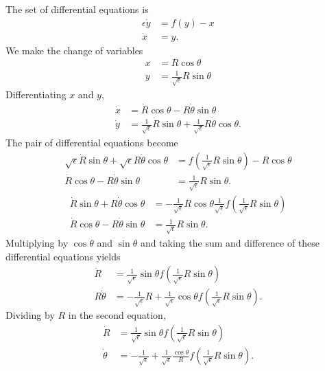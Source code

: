 \begin{Solution}
  The set of differential equations is
  \begin{align*}
    \epsilon \dot{y} &= f(y) - x \\
    \dot{x} &= y.
  \end{align*}
  We make the change of variables
  \begin{align*}
    x &= R \cos \theta \\
    y &= \frac{1}{\sqrt{\epsilon}} R \sin \theta
  \end{align*}
  Differentiating $x$ and $y$,
  \begin{align*}
    \dot{x} &= \dot{R} \cos \theta - R \dot{\theta} \sin \theta \\
    \dot{y} &= \frac{1}{\sqrt{\epsilon}} \dot{R} \sin \theta + 
    \frac{1}{\sqrt{\epsilon}} R \dot{\theta} \cos \theta.
  \end{align*}
  The pair of differential equations become
  \begin{align*}
    \sqrt{\epsilon} \dot{R} \sin \theta +
    \sqrt{\epsilon} R \dot{\theta} \cos \theta &= 
    f\left(\frac{1}{\sqrt{\epsilon}} R \sin\theta \right) -R \cos \theta \\
    \dot{R} \cos \theta - R \dot{\theta} \sin \theta &= \frac{1}{\sqrt{\epsilon}}
    R \sin \theta.
  \end{align*}
  \begin{align*}
    \dot{R} \sin \theta + R \dot{\theta} \cos \theta &= 
    - \frac{1}{\sqrt{\epsilon}} R \cos \theta 
    \frac{1}{\sqrt{\epsilon}}
    f\left(\frac{1}{\sqrt{\epsilon}} R \sin\theta \right)\\ 
    \dot{R} \cos \theta - R \dot{\theta} \sin \theta &= \frac{1}{\sqrt{\epsilon}}
    R \sin \theta.
  \end{align*}
  Multiplying by $\cos\theta$ and $\sin\theta$ and taking the sum and difference
  of these differential equations yields
  \begin{align*}
    \dot{R} &= \frac{1}{\sqrt{\epsilon}} \sin\theta 
    f\left(\frac{1}{\sqrt{\epsilon}} R \sin\theta \right) \\
    R \dot{\theta} &= - \frac{1}{\sqrt{\epsilon}}R + \frac{1}{\sqrt{\epsilon}}
    \cos\theta f\left(\frac{1}{\sqrt{\epsilon}} R \sin\theta \right).
  \end{align*}
  Dividing by $R$ in the second equation,
  \begin{align*}
    \dot{R} &= \frac{1}{\sqrt{\epsilon}} \sin\theta 
    f\left(\frac{1}{\sqrt{\epsilon}} R \sin\theta \right) \\
    \dot{\theta} &= - \frac{1}{\sqrt{\epsilon}} + \frac{1}{\sqrt{\epsilon}}
    \frac{\cos\theta}{R} 
    f\left(\frac{1}{\sqrt{\epsilon}} R \sin\theta \right).
  \end{align*}


\end{Solution}
